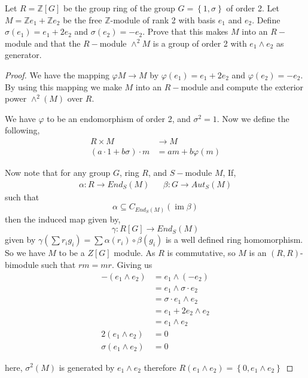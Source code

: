 \documentclass[11pt]{article}
\newenvironment{problem}[2][Problem\!]{\begin{tcolorbox}\begin{trivlist}
\item[\hskip \labelsep {\bfseries #1}\hskip \labelsep {\bfseries #2}]}{\end{trivlist}\end{tcolorbox}}
\newcommand{\zz}{\mathbb Z}   %
\newcommand{\im}{\operatorname{im}} %
\newcommand{\set}[1]{\left\{#1\right\}} %
\renewcommand{\phi}{\varphi}
\begin{document}
\begin{problem} {11.5.9}
    Let $R = \zz[G]$ be the group ring of the group $G = \set{1,\sigma}$ of order 2. Let $M = \zz e_1 + \zz e_2$ be the free $\zz$-module of rank 2 with basis $e_1$ and $e_2$. Define $\sigma(e_1) = e_1 + 2 e_2$ and $\sigma(e_2) = -e_2$. Prove that this makes $M$ into an $R-$module and that the $R-$module $\wedge^{2}M$ is a group of order 2 with $e_1\wedge e_2$ as generator. 
\end{problem}
\begin{proof}
    We have the mapping $\phi M \to M$ by $\phi(e_1) = e_1 + 2e_2$ and $\phi(e_2) = -e_2$. By using this mapping we make $M$ into an $R-$module and compute the exterior power $\wedge^{2}(M)$ over $R$. 

    We have $\phi$ to be an endomorphism of order 2, and $\sigma^{2} = 1$. Now we define the following,
    \begin{align*}
        R\times M &\to M \\
        (a \cdot 1 + b\sigma) \cdot m &= am + b\phi(m)
    \end{align*}

    Now note that for any group $G$, ring $R$, and $S-$module $M$, If,
    \begin{align*}
        \alpha: R \to End_S(M) && \beta:G\to Aut_S(M)
    \end{align*}
    such that 
    \[\alpha \subseteq C_{End_S(M)}(\im \beta)\]
    then the induced map given by,
    \[\gamma: R[G]\to End_S(M)\]
    given by $\gamma(\sum r_i g_i) = \sum \alpha(r_i)\circ \beta(g_i)$ is a well defined ring homomorphism. So we have $M$ to be a $Z[G]$ module. As $R$ is commutative, so  $M$ is an $(R,R)$-bimodule such that $rm = mr$.
    Giving us
    \begin{align*}
        -(e_1 \wedge e_2) &= e_1 \wedge (-e_2) \\
        &= e_1 \wedge \sigma \cdot e_2 \\
        &= \sigma \cdot e_1 \wedge e_2 \\
        &= e_1 + 2e_2 \wedge e_2 \\
        &= e_1 \wedge e_2 \\
        2(e_1 \wedge e_2) &= 0 \\
        \sigma(e_1 \wedge e_2) &= 0
    \end{align*}

    here, $\sigma^{2}(M)$ is generated by $e_1\wedge e_2$ therefore $R(e_1\wedge e_2) = \set{0, e_1\wedge e_2}$


\end{proof}
\end{document}
